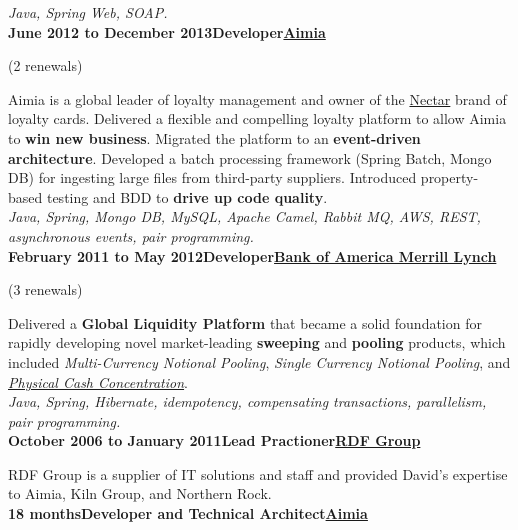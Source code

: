 \documentclass[a4paper,12pt]{article}
\newcommand{\clientwork}[3]{\textbf{#1\hfill#3\hfill#2}\nopagebreak}
\newcommand{\renewals}[1]{(#1 renewals)\nopagebreak}
\newcommand{\techstack}[1]{\textit{#1}}
\begin{document}
\techstack{Java, Spring Web, SOAP.}\\

\clientwork{June 2012 to December 2013}{\href{http://www.aimia.com/}{Aimia}}{Developer}

\renewals{2}

Aimia is a global leader of loyalty management and owner of the \href{http://www.nectar.com/}{Nectar} brand of loyalty cards. Delivered a flexible and compelling loyalty platform to allow Aimia to \textbf{win new business}. Migrated the platform to an \textbf{event-driven architecture}. Developed a batch processing framework (Spring Batch, Mongo DB) for ingesting large files from third-party suppliers. Introduced property-based testing and BDD to \textbf{drive up code quality}.\\

\techstack{Java, Spring, Mongo DB, MySQL, Apache Camel, Rabbit MQ, AWS, REST, asynchronous events, pair programming.}\\

\clientwork{February 2011 to May 2012}{\href{http://corp.bankofamerica.com/}{Bank of America Merrill Lynch}}{Developer}

\renewals{3}


Delivered a \textbf{Global Liquidity Platform} that became a solid foundation for rapidly developing novel market-leading \textbf{sweeping} and \textbf{pooling} products, which included \emph{Multi-Currency Notional Pooling}, \emph{Single Currency Notional Pooling}, and \emph{\href{http://www.marketwatch.com/story/bank-of-america-merrill-lynch-adds-physical-cash-concentration-to-global-liquidity-platform-2012-03-19}{Physical Cash Concentration}}.\\

\techstack{Java, Spring, Hibernate, idempotency, compensating transactions, parallelism, pair programming.}\\

\clientwork{October 2006 to January 2011}{\href{http://www.rdfgroup.com/}{RDF Group}}{Lead Practioner}

RDF Group is a supplier of IT solutions and staff and provided David's expertise to Aimia, Kiln Group, and Northern Rock.\\

\clientwork{18 months}{\href{http://www.aimia.com/}{Aimia}}{Developer and Technical Architect}
\end{document}

